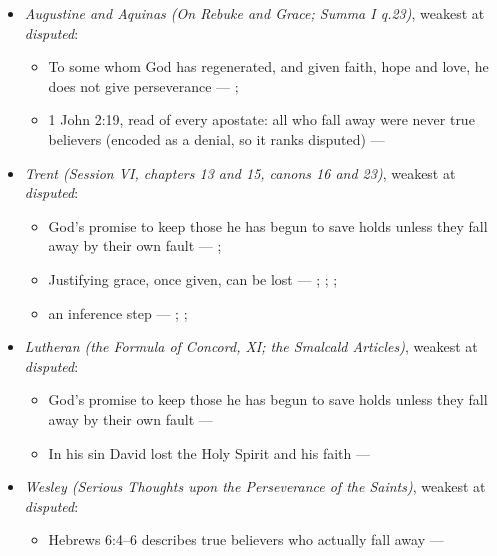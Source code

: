 \documentclass[11pt]{article}
\begin{document}
\begin{itemize}
\begin{itemize}
\end{itemize}
\item \emph{Augustine and Aquinas (On Rebuke and Grace; Summa I q.23)}, weakest at \emph{disputed}:
\begin{itemize}
\item To some whom God has regenerated, and given faith, hope and love, he does not give perseverance --- \cite[478]{npnf1-05-1887}; \cite[On Rebuke and Grace, ch. 18]{npnf1-05-1887}
\item 1 John 2:19, read of every apostate: all who fall away were never true believers (encoded as a denial, so it ranks disputed) --- \cite[479--480]{npnf1-05-1887}
\end{itemize}
\item \emph{Trent (Session VI, chapters 13 and 15, canons 16 and 23)}, weakest at \emph{disputed}:
\begin{itemize}
\item God’s promise to keep those he has begun to save holds unless they fall away by their own fault --- \cite[Trent, Session VI (1547), ch. 13]{tanner-decrees-1990}; \cite[40]{waterworth-trent-1848}
\item Justifying grace, once given, can be lost --- \cite[Trent, Session VI (1547), ch. 15]{tanner-decrees-1990}; \cite[42]{waterworth-trent-1848}; \cite[Trent, Session VI (1547), canon 23]{tanner-decrees-1990}; \cite[47]{waterworth-trent-1848}
\item an inference step --- \cite[329--330]{calvin-corinthians-1-1848}; \cite[Trent, Session VI (1547), ch. 13]{tanner-decrees-1990}; \cite[40--41]{waterworth-trent-1848}
\end{itemize}
\item \emph{Lutheran (the Formula of Concord, XI; the Smalcald Articles)}, weakest at \emph{disputed}:
\begin{itemize}
\item God’s promise to keep those he has begun to save holds unless they fall away by their own fault --- \cite[Solid Declaration XI.42]{concordia-triglotta-1921}
\item In his sin David lost the Holy Spirit and his faith --- \cite[Smalcald Articles III.iii.43]{concordia-triglotta-1921}
\end{itemize}
\item \emph{Wesley (Serious Thoughts upon the Perseverance of the Saints)}, weakest at \emph{disputed}:
\begin{itemize}
\item Hebrews 6:4–6 describes true believers who actually fall away --- \cite[449]{wesley-works-9-1827}

\end{itemize}
\end{itemize}
\end{document}
